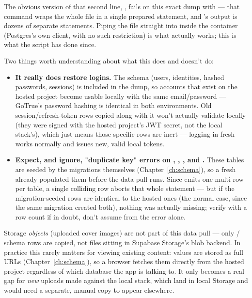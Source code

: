 \begin{olkgotcha}
The obvious version of that second line, , fails on this exact dump with  — that command wraps the whole file in a single prepared statement, and 's output is dozens of separate statements. Piping the file straight into  inside the  container (Postgres's own client, with no such restriction) is what actually works; this is what the script has done since.
\end{olkgotcha}

Two things worth understanding about what this does and doesn't do:

\begin{itemize}
  \item \textbf{It really does restore logins.} The  schema (users, identities, hashed passwords, sessions) is included in the dump, so accounts that exist on the hosted project become usable locally with the same email/password — GoTrue's password hashing is identical in both environments. Old session/refresh-token rows copied along with it won't actually validate locally (they were signed with the hosted project's JWT secret, not the local stack's), which just means those specific rows are inert — logging in fresh works normally and issues new, valid local tokens.
  \item \textbf{Expect, and ignore, "duplicate key" errors on , , , and .} These tables are seeded by the migrations themselves (Chapter~\ref{ch:schema}), so a fresh  already populated them before the data pull runs. Since  emits one multi-row  per table, a single colliding row aborts that whole statement — but if the migration-seeded rows are identical to the hosted ones (the normal case, since the same migration created both), nothing was actually missing; verify with a row count if in doubt, don't assume from the error alone.
\end{itemize}

\begin{olkwarn}
Storage \emph{objects} (uploaded cover images) are not part of this data pull — only / schema rows are copied, not files sitting in Supabase Storage's blob backend. In practice this rarely matters for viewing existing content:  values are stored as full  URLs (Chapter~\ref{ch:schema}), so a browser fetches them directly from the hosted project regardless of which database the app is talking to. It only becomes a real gap for \emph{new} uploads made against the local stack, which land in local Storage and would need a separate, manual copy to appear elsewhere.
\end{olkwarn}

